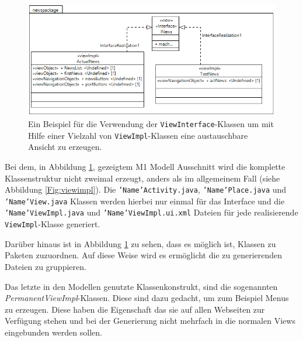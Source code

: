 \begin{figure}[htbp]
\begin{center}
\includegraphics[width=1.0\textwidth]{./img/GWT-Model-Views-interface.png}
\caption{Ein Beispiel für die Verwendung der \texttt{ViewInterface}-Klassen
um mit Hilfe einer Vielzahl von \texttt{ViewImpl}-Klassen
eine austauschbare Ansicht zu erzeugen.}\label{Fig:viewInterface}
\end{center}
\end{figure} 

Bei dem, in Abbildung \ref{Fig:viewInterface}, gezeigtem M1 Modell Ausschnitt
wird die komplette Klassenstruktur nicht zweimal erzeugt, anders als im
allgemeinem Fall (siehe Abbildung \ref{Fig:viewimpl}). Die
\texttt{'Name'Activity.java}, \texttt{'Name'Place.java} und \\
\texttt{'Name'View.java} Klassen werden hierbei nur einmal für das Interface
und die \texttt{'Name'ViewImpl.java} und \texttt{'Name'ViewImpl.ui.xml}
Dateien für jede realisierende \texttt{ViewImpl}-Klasse generiert. 

Darüber hinaus ist in Abbildung \ref{Fig:viewInterface} zu sehen, dass es
möglich ist, Klassen zu Paketen zuzuordnen. Auf diese Weise wird es
ermöglicht die zu generierenden Dateien zu gruppieren. 

\newpage
Das letzte in den Modellen genutzte Klassenkonstrukt, sind die sogenannten
\textit{PermanentViewImpl}-Klassen. Diese sind dazu gedacht, um zum Beispiel
Menus zu erzeugen. Diese haben die Eigenschaft das sie auf allen Webseiten zur
Verfügung stehen und bei der Generierung nicht mehrfach in die normalen Views
eingebunden werden sollen.

